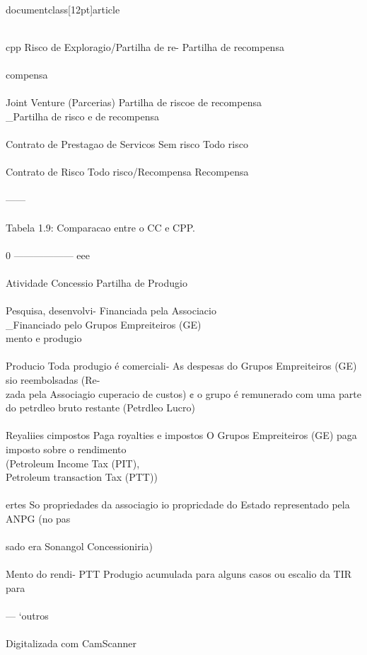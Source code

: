 \\documentclass[12pt]{article}
\begin{document}
\\
cpp Risco de Exploragio/Partilha de re- Partilha de recompensa\\
\\
compensa\\
\\
Joint Venture (Parcerias) Partilha de riscoe de recompensa \\_Partilha de risco e de recompensa\\
\\
Contrato de Prestagao de Servicos Sem risco Todo risco\\
\\
Contrato de Risco Todo risco/Recompensa Recompensa\\
\\
——\\
\\
Tabela 1.9: Comparacao entre o CC e CPP.\\
\\
0 —————— eee\\
\\
Atividade Concessio Partilha de Produgio\\
\\
Pesquisa, desenvolvi- Financiada pela Associacio \\_Financiado pelo Grupos Empreiteiros (GE)\\
mento e produgio\\
\\
Producio Toda produgio é comerciali- As despesas do Grupos Empreiteiros (GE) sio reembolsadas (Re-\\
zada pela Associagio cuperacio de custos) ¢ o grupo é remunerado com uma parte\\
do petrdleo bruto restante (Petrdleo Lucro)\\
\\
Reyaliies cimpostos Paga royalties e impostos O Grupos Empreiteiros (GE) paga imposto sobre o rendimento\\
(Petroleum Income Tax (PIT),\\
Petroleum transaction Tax (PTT))\\
\\
ertes So propriedades da associagio io propricdade do Estado representado pela ANPG (no pas\\
\\
sado era Sonangol Concessioniria)\\
\\
Mento do rendi- PTT Produgio acumulada para alguns casos ou escalio da TIR para\\
\\
— ‘outros\\
\\
Digitalizada com CamScanner\\
\end{document}
